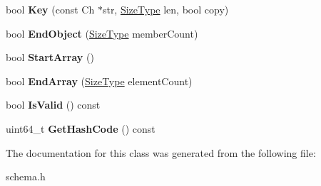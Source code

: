 \begin{DoxyCompactItemize}
\item 
\mbox{\label{a02368_a1b34d88f85f9c6a739c1f9038f14f078}} 
bool {\bfseries Key} (const Ch $\ast$str, \hyperlink{a00560_a5ed6e6e67250fadbd041127e6386dcb5}{Size\+Type} len, bool copy)
\item 
\mbox{\label{a02368_a7050f1552d88967944195163a6a0b08e}} 
bool {\bfseries End\+Object} (\hyperlink{a00560_a5ed6e6e67250fadbd041127e6386dcb5}{Size\+Type} member\+Count)
\item 
\mbox{\label{a02368_a2ceb3cc00216f6b6ce66907856a16404}} 
bool {\bfseries Start\+Array} ()
\item 
\mbox{\label{a02368_ad445b2730be23e18b4dec2c4d1033419}} 
bool {\bfseries End\+Array} (\hyperlink{a00560_a5ed6e6e67250fadbd041127e6386dcb5}{Size\+Type} element\+Count)
\item 
\mbox{\label{a02368_ae09fee05c56194031e8af94a1b1be145}} 
bool {\bfseries Is\+Valid} () const
\item 
\mbox{\label{a02368_ac221aaaa0d643aae553125e76aed7b47}} 
uint64\+\_\+t {\bfseries Get\+Hash\+Code} () const
\end{DoxyCompactItemize}


The documentation for this class was generated from the following file\+:\begin{DoxyCompactItemize}
\item 
schema.\+h\end{DoxyCompactItemize}
